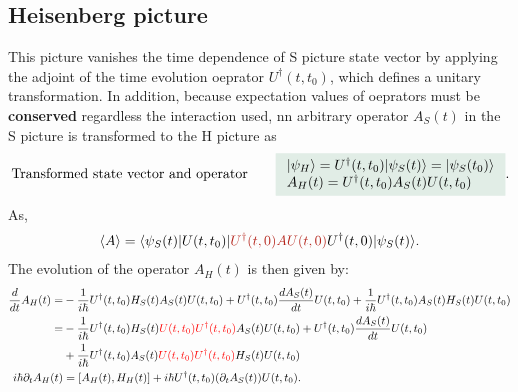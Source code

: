 \subsection{Heisenberg picture}
This picture vanishes the time dependence of S picture state vector by applying the adjoint of the time evolution oeprator $U^\dagger(t,t_0)$, which defines a unitary transformation.
In addition, because expectation values of oeprators must be \textbf{conserved} regardless the interaction used, nn arbitrary operator $A_S(t)$ in the S picture is transformed to the H picture as 
\begin{align*}
    \text{Transformed state vector and operator}\qquad\highlight{
    \begin{array}{l}
    \ket{\psi_H}=U^\dagger(t,t_0)\ket{\psi_S(t)}=\ket{\psi_S(t_0)}\\
    A_H(t)=U^\dagger(t,t_0)A_S(t)U(t,t_0)
    \end{array}}.
\end{align*}
As,
\begin{align*}
    \braket{A}=\braket{\psi_S(t)|U(t,t_0)|\textcolor{BrickRed}{U^\dagger(t,0)AU(t,0)}U^\dagger(t,0)|\psi_S(t)}.
\end{align*}
The evolution of the operator $A_H(t)$ is then given by:
\begin{align*}
    \frac{d}{dt}A_H(t)=&-\frac{1}{i\hbar}U^\dagger(t,t_0)H_S(t)A_S(t)U(t,t_0)+U^\dagger(t,t_0)\frac{dA_S(t)}{dt}U(t,t_0)+\frac{1}{i\hbar}U^\dagger(t,t_0)A_S(t)H_S(t)U(t,t_0)\\
    =&-\frac{1}{i\hbar}U^\dagger(t,t_0)H_S(t)\textcolor{red}{U(t,t_0)U^\dagger(t,t_0)}A_S(t)U(t,t_0)+U^\dagger(t,t_0)\frac{dA_S(t)}{dt}U(t,t_0)\\
    &+\frac{1}{i\hbar}U^\dagger(t,t_0)A_S(t)\textcolor{red}{U(t,t_0)U^\dagger(t,t_0)}H_S(t)U(t,t_0)\\
    i\hbar\partial_tA_H(t)&=[A_H(t),H_H(t)]+i\hbar U^\dagger(t,t_0)(\partial_tA_S(t))U(t,t_0).
\end{align*}

